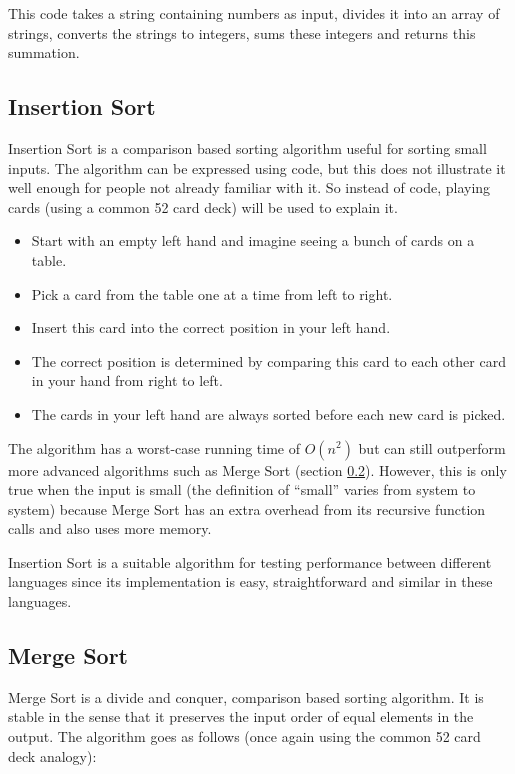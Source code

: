 This code takes a string containing numbers as input, divides it into an array of strings, converts the strings to integers, sums these integers and returns this summation.

\subsection{Insertion Sort}
Insertion Sort is a comparison based sorting algorithm useful for sorting small inputs. The algorithm can be expressed using code, but this does not illustrate it well enough for people not already familiar with it. So instead of code, playing cards (using a common 52 card deck) will be used to explain it.

\begin{itemize}
\item Start with an empty left hand and imagine seeing a bunch of cards on a table.
\item Pick a card from the table one at a time from left to right.
\item Insert this card into the correct position in your left hand.
\item The correct position is determined by comparing this card to each other card in your hand from right to left.
\item The cards in your left hand are always sorted before each new card is picked.
\end{itemize} 

The algorithm has a worst-case running time of $O(n^2)$ but can still outperform more advanced algorithms such as Merge Sort (section \ref{subsec:merge_sort}). However, this is only true when the input is small (the definition of ``small'' varies from system to system) \cite{Insertionsort} because Merge Sort has an extra overhead from its recursive function calls and also uses more memory.

Insertion Sort is a suitable algorithm for testing performance between different languages since its implementation is easy, straightforward and similar in these languages.


\subsection{Merge Sort} \label{subsec:merge_sort}
Merge Sort is a divide and conquer, comparison based sorting algorithm. It is stable in the sense that it preserves the input order of equal elements in the output. The algorithm goes as follows (once again using the common 52 card deck analogy):

